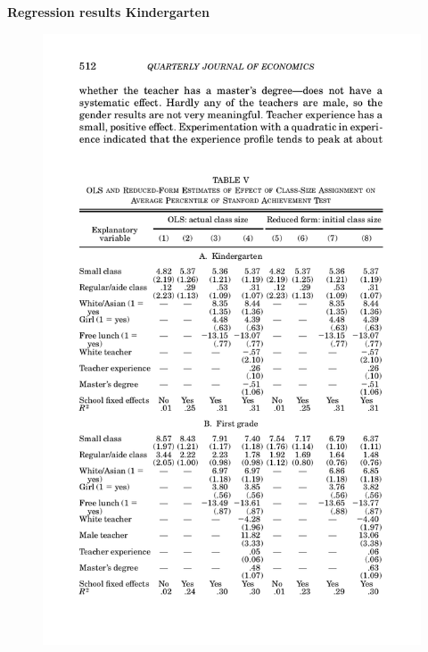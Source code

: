 \documentclass{beamer}
\begin{document}
\begin{frame}[plain]
	\begin{center}
	\textbf{Regression results Kindergarten}
	\end{center}
	
	\begin{figure}
	\includegraphics{./lecture_includes/krueger1999_table5a.pdf}
	\end{figure}
\end{frame}
\end{document}
